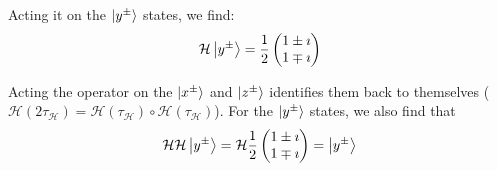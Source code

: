\documentclass[a4paper,twoside]{article}
\begin{document}
\begin{itemize}
\begin{tcolorbox}[breakable]
Acting it on the $\ket{y^\pm}$ states, we find:
\begin{equation}
    \mathcal{H}\ket{y^\pm} = \frac{1}{2}\begin{pmatrix} 1\pm\imath \\ 1\mp\imath \end{pmatrix} 
\end{equation}

Acting the operator on the $\ket{x^\pm}$ and $\ket{z^\pm}$ identifies them back to themselves ($\mathcal{H}(2\tau_\mathcal{H}) = \mathcal{H}(\tau_\mathcal{H})\circ\mathcal{H}(\tau_\mathcal{H})$). For the $\ket{y^\pm}$ states, we also find that
\begin{equation}
    \mathcal{H}\mathcal{H}\ket{y^\pm} = \mathcal{H} \frac{1}{2}\begin{pmatrix} 1\pm\imath \\ 1\mp\imath \end{pmatrix} = \ket{y^\pm}
\end{equation}
\end{tcolorbox}


\end{itemize}
\end{document}
